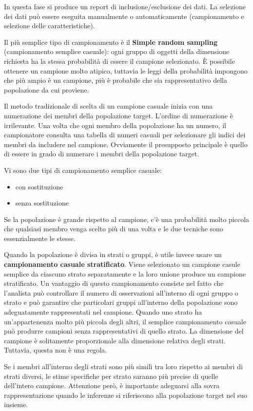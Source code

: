 \documentclass[a4paper]{extarticle}
\begin{document}
In questa fase si produce un report di inclusione/esclusione dei dati. La selezione dei dati può essere eseguita manualmente o automaticamente (campionamento e selezione delle caratteristiche).

Il più semplice tipo di campionamento è il \textbf{Simple random sampling} (campionamento semplice casuale): ogni gruppo di oggetti della dimensione richiesta ha la stessa probabilità di essere il campione selezionato. È possibile ottenere un campione molto atipico, tuttavia le leggi della probabilità impongono che più ampio è un campione, più è probabile che sia rappresentativo della popolazione da cui proviene. 

Il metodo tradizionale di scelta di un campione casuale inizia con una numerazione dei membri della popolazione target. L'ordine di numerazione è irrilevante. Una volta che ogni membro della popolazione ha un numero, il campionatore consulta una tabella di numeri casuali per selezionare gli indici dei membri da includere nel campione. Ovviamente il presupposto principale è quello di essere in grado di numerare i membri della popolazione target. 

Vi sono due tipi di campionamento semplice casuale:
\begin{itemize}
\item con sostituzione
\item senza sostituzione
\end{itemize}

Se la popolazione è grande rispetto al campione, c'è una probabilità molto piccola che qualsiasi membro venga scelto più di una volta e le due tecniche sono essenzialmente le stesse.

Quando la popolazione è divisa in strati o gruppi, è utile invece usare un \textbf{campionamento casuale stratificato}. Viene selezionato un campione casule semplice da ciascuno strato separatamente e la loro unione produce un campione stratificato. Un vantaggio di questo campionamento consiste nel fatto che l'analista può controllare il numero di osservazioni all'interno di ogni gruppo o strato e può garantire che particolari gruppi all'interno della popolazione sono adeguatamente rappresentati nel campione. Quando uno strato ha un'appartenenza molto più piccola degli altri, il semplice campionamento casuale può produrre campioni senza rappresentativi di quello strato. La dimensione del campione è solitamente proporzionale alla dimensione relativa degli strati. Tuttavia, questa non è una regola.

Se i membri all'interno degli strati sono più simili tra loro rispetto ai membri di strati diversi, le stime specifiche per strato saranno più precise di quelle dell'intero campione. Attenzione però, è importante adeguarsi alla sovra rappresentazione quando le inferenze si riferiscono alla popolazione target nel suo insieme.
\end{document}
